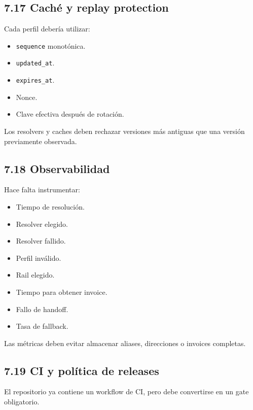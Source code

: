 \documentclass[
]{article}
\providecommand{\tightlist}{%
  \setlength{\itemsep}{0pt}\setlength{\parskip}{0pt}}
\begin{document}
\hypertarget{cachuxe9-y-replay-protection}{%
\subsection{7.17 Caché y replay
protection}\label{cachuxe9-y-replay-protection}}

Cada perfil debería utilizar:

\begin{itemize}
\tightlist
\item
  \texttt{sequence} monotónica.
\item
  \texttt{updated\_at}.
\item
  \texttt{expires\_at}.
\item
  Nonce.
\item
  Clave efectiva después de rotación.
\end{itemize}

Los resolvers y caches deben rechazar versiones más antiguas que una
versión previamente observada.

\hypertarget{observabilidad}{%
\subsection{7.18 Observabilidad}\label{observabilidad}}

Hace falta instrumentar:

\begin{itemize}
\tightlist
\item
  Tiempo de resolución.
\item
  Resolver elegido.
\item
  Resolver fallido.
\item
  Perfil inválido.
\item
  Rail elegido.
\item
  Tiempo para obtener invoice.
\item
  Fallo de handoff.
\item
  Tasa de fallback.
\end{itemize}

Las métricas deben evitar almacenar aliases, direcciones o invoices
completas.

\hypertarget{ci-y-poluxedtica-de-releases}{%
\subsection{7.19 CI y política de
releases}\label{ci-y-poluxedtica-de-releases}}

El repositorio ya contiene un workflow de CI, pero debe convertirse en
un gate obligatorio.
\end{document}
